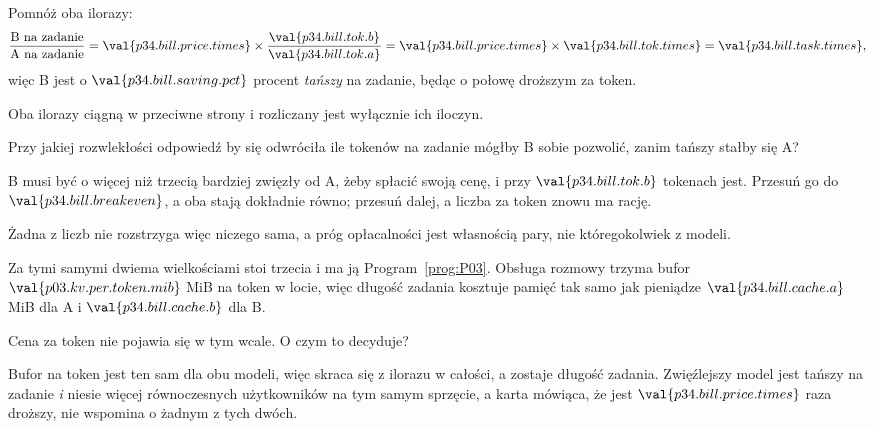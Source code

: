 \begin{fr}
\begin{ansblock}
Pomnóż oba ilorazy:
\[ \frac{\text{B na zadanie}}{\text{A na zadanie}}
   = \val{p34.bill.price.times} \times
     \frac{\val{p34.bill.tok.b}}{\val{p34.bill.tok.a}}
   = \val{p34.bill.price.times} \times \val{p34.bill.tok.times}
   = \val{p34.bill.task.times} , \]
więc B jest o $\val{p34.bill.saving.pct}$ procent \emph{tańszy} na zadanie,
będąc o połowę droższym za token.
\end{ansblock}

Oba ilorazy ciągną w przeciwne strony i rozliczany jest wyłącznie ich
iloczyn.

Przy jakiej rozwlekłości odpowiedź by się odwróciła \dash{} ile tokenów na
zadanie mógłby B sobie pozwolić, zanim tańszy stałby się A?
\dotline
\nextframe
\end{fr}

\begin{fr}

B musi być o więcej niż trzecią bardziej zwięzły od A, żeby spłacić swoją
cenę, i przy $\val{p34.bill.tok.b}$ tokenach jest. Przesuń go do
$\val{p34.bill.breakeven}$, a oba stają dokładnie równo; przesuń dalej, a
liczba za token znowu ma rację.

Żadna z liczb nie rozstrzyga więc niczego sama, a próg opłacalności jest
własnością pary, nie któregokolwiek z modeli.
\end{fr}

\begin{fr}
Za tymi samymi dwiema wielkościami stoi trzecia i ma ją
Program~\ref{prog:P03}. Obsługa rozmowy trzyma bufor
$\val{p03.kv.per.token.mib}$ MiB na token w locie, więc długość zadania
kosztuje pamięć tak samo jak pieniądze \dash{} $\val{p34.bill.cache.a}$ MiB
dla A i $\val{p34.bill.cache.b}$ dla B.

Cena za token nie pojawia się w tym wcale. O czym to decyduje?
\dotline
\nextframe
\end{fr}

\begin{fr}

Bufor na token jest ten sam dla obu modeli, więc skraca się z ilorazu w
całości, a zostaje długość zadania. Zwięźlejszy model jest tańszy na zadanie
\emph{i} niesie więcej równoczesnych użytkowników na tym samym sprzęcie, a
karta mówiąca, że jest $\val{p34.bill.price.times}$ raza droższy, nie wspomina
o żadnym z tych dwóch.
\end{fr}

